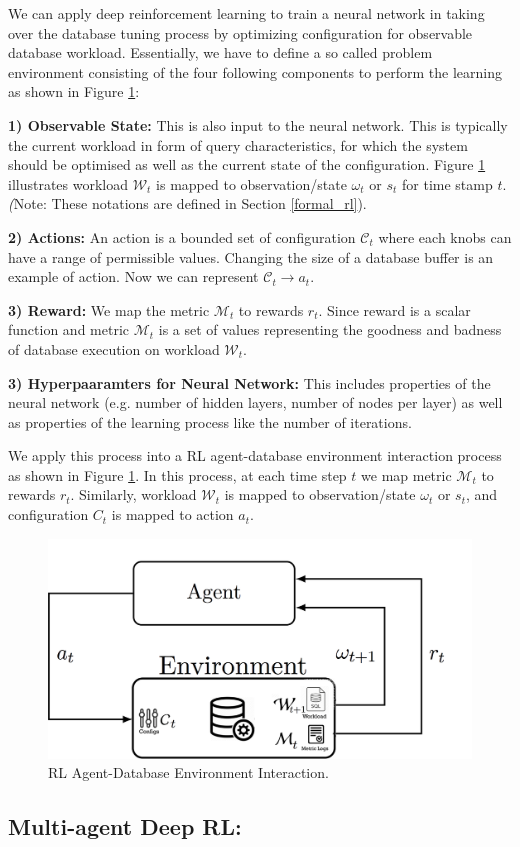 We can apply deep reinforcement learning to train a neural network in taking
over the database tuning process by optimizing configuration for observable database workload.
Essentially, we have to define a so called problem environment
consisting of the four following components to perform the learning as shown in Figure \ref{fig:database_agent}:


\textbf{1) Observable State:} This is also input to the neural network. This is typically the current workload in form of
query characteristics, for which the system should be optimised as well as the current state
of the configuration. Figure \ref{fig:database_agent} illustrates workload $\mathcal{W}_t$ is mapped to observation/state $\omega_t$ or $s_t$ for time stamp $t$.\\
\textit(Note: These notations are defined in Section \ref{formal_rl}).

\textbf{2) Actions:} An action is a bounded set of configuration $\mathcal{C}_t$ where each knobs can have a range of permissible values.
Changing the size of a database buffer is an example of action. Now we can represent $\mathcal{C}_t  \rightarrow a_t$.

\textbf{3) Reward:}
We map the metric $\mathcal{M}_t$ to rewards $r_t$. Since reward is a scalar function and metric $\mathcal{M}_t$ is a set of values representing the goodness and badness of database execution on workload $\mathcal{W}_t$.

\textbf{3) Hyperpaaramters for Neural Network:}
This includes properties of
the neural network (e.g. number of hidden layers, number of nodes per layer) as well as
properties of the learning process like the number of iterations.


We apply this process into a RL agent-database environment interaction process as shown in Figure \ref{fig:database_agent}.
In this process, at each time step $t$ we map metric $\mathcal{M}_t$ to rewards $r_t$. Similarly, workload $\mathcal{W}_t$ is mapped to observation/state $\omega_t$ or $s_t$, and configuration $C_t$ is mapped to action $a_t$.



\begin{figure}[t]
	\includegraphics[width=0.9\linewidth ]{fig/database_agent.png}
    \vspace{-2mm}
    \caption{RL Agent-Database Environment Interaction.}
    \label{fig:database_agent}
\end{figure}


\subsection*{Multi-agent Deep RL:}







